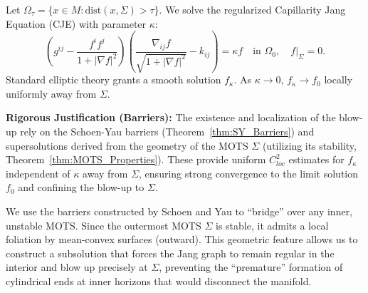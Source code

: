 \begin{theorem}
Let $\Omega_\tau = \{ x \in M : \text{dist}(x, \Sigma) > \tau \}$. We solve the regularized Capillarity Jang Equation (CJE) with parameter $\kappa$:
\begin{equation}
    \left( g^{ij} - \frac{f^i f^j}{1+|\nabla f|^2} \right) \left( \frac{\nabla_{ij}f}{\sqrt{1+|\nabla f|^2}} - k_{ij} \right) = \kappa f \quad \text{in } \Omega_0, \quad f|_{\Sigma} = 0.
\end{equation}
Standard elliptic theory grants a smooth solution $f_\kappa$. As $\kappa \to 0$, $f_\kappa \to f_0$ locally uniformly away from $\Sigma$.

\textbf{Rigorous Justification (Barriers):} The existence and localization of the blow-up rely on the Schoen-Yau barriers (Theorem~\ref{thm:SY_Barriers}) and supersolutions derived from the geometry of the MOTS $\Sigma$ (utilizing its stability, Theorem~\ref{thm:MOTS_Properties}). These provide uniform $C^2_{loc}$ estimates for $f_\kappa$ independent of $\kappa$ away from $\Sigma$, ensuring strong convergence to the limit solution $f_0$ and confining the blow-up to $\Sigma$.

\begin{remark}
We use the barriers constructed by Schoen and Yau to ``bridge'' over any inner, unstable MOTS. Since the outermost MOTS $\Sigma$ is stable, it admits a local foliation by mean-convex surfaces (outward). This geometric feature allows us to construct a subsolution that forces the Jang graph to remain regular in the interior and blow up precisely at $\Sigma$, preventing the ``premature'' formation of cylindrical ends at inner horizons that would disconnect the manifold.
\end{remark}


\end{theorem}
